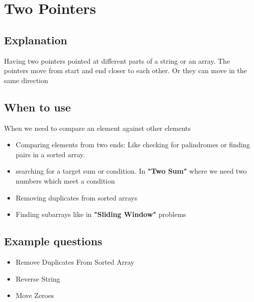 \chapter{Two Pointers}

\section{Explanation}

Having two pointers pointed at different parts of a string or an array. The pointers move from start and end closer to each other. Or they can move in the same direction

\section{When to use}
When we need to compare an element against other elements

\begin{itemize}
\item Comparing elements from two ends: Like checking for palindromes or finding pairs in a sorted array.
\item searching for a target sum or condition. In \textbf{"Two Sum"} where we need two numbers which meet a condition
\item Removing duplicates from sorted arrays
\item Finding subarrays like in \textbf{"Sliding Window"} problems
\end{itemize}	

\section{Example questions}
\begin{itemize}
\item Remove Duplicates From Sorted Array
\item Reverse String
\item Move Zeroes
\end{itemize}	